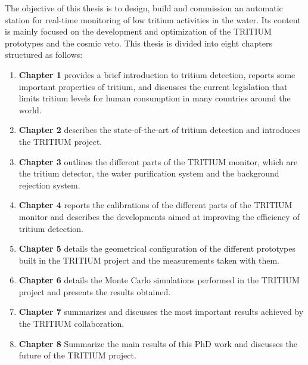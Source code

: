 The objective of this thesis is to design, build and commission an automatic station for real-time monitoring of low tritium activities in the water. Its content is mainly focused on the development and optimization of the TRITIUM prototypes and the cosmic veto. This thesis is divided into eight chapters structured as follows:

\begin{enumerate}
\item{} \textbf{Chapter 1} provides a brief introduction to tritium detection, reports some important properties of tritium, and discusses the current legislation that limits tritium levels for human consumption in many countries around the world. 

\item{} \textbf{Chapter 2} describes the state-of-the-art of tritium detection and introduces the TRITIUM project. 

\item{} \textbf{Chapter 3} outlines the different parts of the TRITIUM monitor, which are the tritium detector, the water purification system and the background rejection system. 

\item{} \textbf{Chapter 4} reports the calibrations of the different parts of the TRITIUM monitor and describes the developments aimed at improving the efficiency of tritium detection. 

\item{} \textbf{Chapter 5} details the geometrical configuration of the different prototypes built in the TRITIUM project and the measurements taken with them. 

\item{} \textbf{Chapter 6} details the Monte Carlo simulations performed in the TRITIUM project and presents the results obtained. 

\item{} \textbf{Chapter 7} summarizes and discusses the most important results achieved by the TRITIUM collaboration.

\item{} \textbf{Chapter 8} Summarize the main results of this PhD work and discusses the future of the TRITIUM project.

\end{enumerate}

